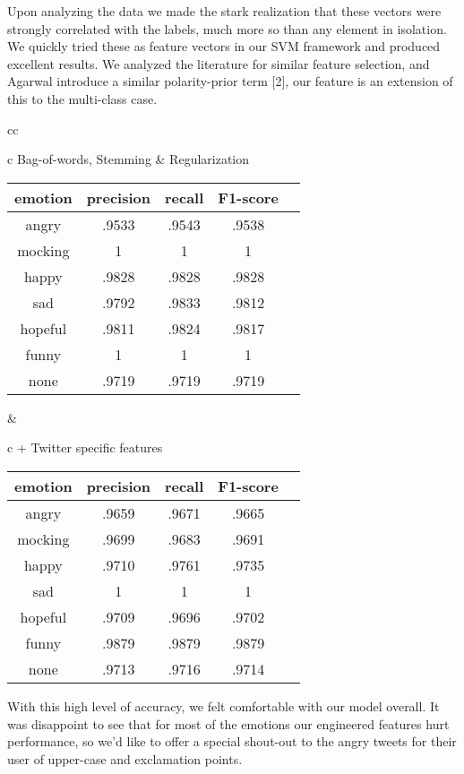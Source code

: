 \documentclass[11pt]{article}
\begin{document}
Upon analyzing the data we made the stark realization that these vectors were strongly correlated with the labels, much more so than any element in isolation. We quickly tried these as feature vectors in our SVM framework and produced excellent results. We analyzed the literature for similar feature selection, and Agarwal introduce a similar polarity-prior term [2], our feature is an extension of this to the multi-class case.

\begin{center}
\begin{tabular}{cc}
\begin{tabular}{c}
Bag-of-words, Stemming \& Regularization \tabularnewline
\begin{tabular}{|c|c|c|c|c|}
\hline 
emotion & precision & recall & F1-score\tabularnewline
\hline 
\hline 
angry  & .9533 & .9543 & .9538\tabularnewline
\hline 
mocking  & 1 & 1 & 1\tabularnewline
\hline 
happy  & .9828 & .9828 & .9828\tabularnewline
\hline 
sad  & .9792 & .9833 & .9812\tabularnewline
\hline 
hopeful  & .9811 & .9824 & .9817\tabularnewline
\hline 
funny  & 1 & 1 & 1\tabularnewline
\hline 
none  & .9719 & .9719 & .9719\tabularnewline
\hline 
\end{tabular}
\end{tabular}

&

\begin{tabular}{c}
+ Twitter specific features \tabularnewline
\begin{tabular}{|c|c|c|c|c|}
\hline 
emotion  & precision & recall & F1-score\tabularnewline
\hline 
\hline 
angry  & .9659 & .9671 & .9665\tabularnewline
\hline 
mocking  & .9699 & .9683 & .9691\tabularnewline
\hline 
happy  & .9710 & .9761 & .9735\tabularnewline
\hline 
sad  & 1 & 1 & 1\tabularnewline
\hline 
hopeful  & .9709 & .9696 & .9702\tabularnewline
\hline 
funny  & .9879 & .9879 & .9879\tabularnewline
\hline 
none  & .9713 & .9716 & .9714\tabularnewline
\hline 
\end{tabular}
\end{tabular}
\end{tabular}
\end{center}

With this high level of accuracy, we felt comfortable with our model overall. It was disappoint to see that for most of the emotions our engineered features hurt performance, so we'd like to offer a special shout-out to the angry tweets for their user of upper-case and exclamation points.
\end{document}
